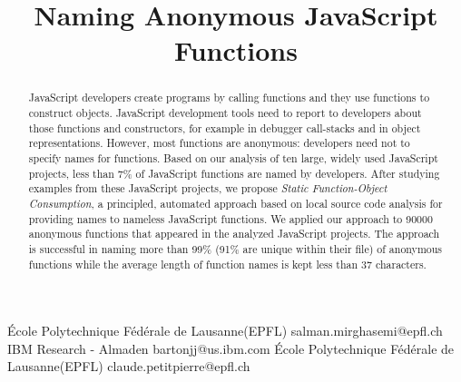 \documentclass[10pt, preprint]{sigplanconf}
\begin{document}
\copyrightdata{[to be supplied]} 


\title{Naming Anonymous JavaScript Functions}

           {\'Ecole Polytechnique F\'ed\'erale de Lausanne(EPFL)}
           {salman.mirghasemi@epfl.ch}
           {IBM Research - Almaden}
           {bartonjj@us.ibm.com} 
           {\'Ecole Polytechnique F\'ed\'erale de Lausanne(EPFL)}
           {claude.petitpierre@epfl.ch}

\maketitle

\begin{abstract}
JavaScript developers create programs by calling functions and they use functions to construct objects. JavaScript development tools need to report to developers about those functions and constructors, for example in debugger call-stacks and in object representations. However, most functions are anonymous: developers need not to specify names for functions.  
 Based on our analysis of ten large, widely used JavaScript projects, less than 7\% of JavaScript functions are named by developers. 
After studying examples from these JavaScript projects, we propose \textit{Static Function-Object Consumption}, a principled, automated approach based on local source code analysis for providing names to nameless JavaScript functions. We applied our approach to 90000 anonymous functions that appeared in the analyzed JavaScript projects. The approach is successful in naming more than 99\% (91\% are unique within their file) of anonymous functions while the average length of function names is kept less than 37 characters.%

\end{abstract}
\end{document}
